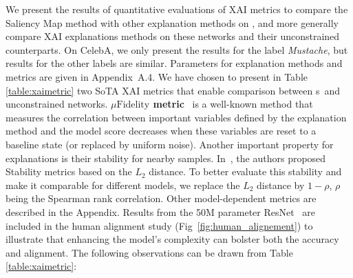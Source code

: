 We present the results of quantitative evaluations of XAI metrics to compare the Saliency Map method with other explanation methods on \otnn, and more generally compare XAI explanations methods on these networks and their unconstrained counterparts. On CelebA, we only present  the results for the label \textit{Mustache}, but results for the other labels are similar. Parameters for explanation methods and metrics are given in Appendix~A.4. We have chosen to present in Table \ref{table:xaimetric}  two SoTA XAI metrics that enable comparison between \otnn s~and unconstrained networks.  \textbf{$\mu\text{Fidelity}$ metric}~\cite{Bhatt20muFidelity} is a well-known method that measures the correlation between important variables defined by the explanation method and the model score decreases when these variables are reset to a baseline state (or replaced by uniform noise). Another important property for explanations is their stability for nearby samples. In~\cite{Yeh19InfidelityExplain}, the authors proposed Stability metrics based on the $L_2$ distance. To better evaluate this stability and make it comparable for different models, we replace the $L_2$ distance by $1-\rho$, $\rho$ being the Spearman rank correlation. Other model-dependent metrics are described in the Appendix. Results from the 50M parameter ResNet \otnn~are included in the human alignment study (Fig~\ref{fig:human_alignement}) to illustrate that enhancing the model's complexity can bolster both the accuracy and alignment. The following observations can be drawn from Table \ref{table:xaimetric}:

